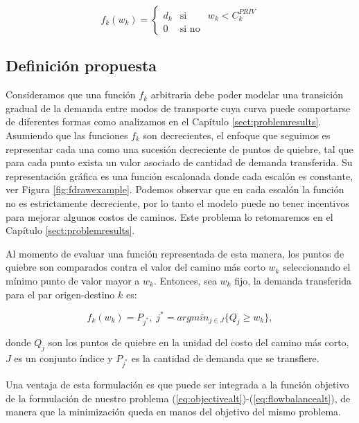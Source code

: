 \begin{equation}
  \label{eq:allornothing}
  f_k(w_k) = \left\{ \begin{array}{lcr}
    d_k & \mbox{si}   & w_k < C^{PRIV}_k \\
          0 & \mbox{si no} &
  \end{array}
  \right.
\end{equation}

\subsection{Definición propuesta}

Consideramos que una función $f_k$ arbitraria debe poder modelar una transición gradual de la demanda entre modos de transporte cuya curva puede comportarse de diferentes formas como analizamos en el Capítulo \ref{sect:problemresults}. Asumiendo que las funciones $f_k$ son decrecientes, el enfoque que seguimos es representar cada una como una sucesión decreciente de puntos de quiebre, tal que para cada punto exista un valor asociado de cantidad de demanda transferida. Su representación gráfica es una función escalonada donde cada escalón es constante, ver Figura \ref{fig:fdrawexample}. Podemos observar que en cada escalón la función no es estrictamente decreciente, por lo tanto el modelo puede no tener incentivos para mejorar algunos costos de caminos. Este problema lo retomaremos en el Capítulo \ref{sect:problemresults}.

Al momento de evaluar una función representada de esta manera, los puntos de quiebre son comparados contra el valor del camino más corto $w_k$ seleccionando el mínimo punto de valor mayor a $w_k$. Entonces, sea $w_k$ fijo, la demanda transferida para el par origen-destino $k$ es:

\begin{equation}
  \label{eq:deffks}
  f_k(w_k) = P_{j^*},\; j^* = argmin_{j \in J} \{Q_j \geq w_k\},
\end{equation}

donde $Q_j$ son los puntos de quiebre en la unidad del costo del camino más corto, $J$ es un conjunto índice y $P_{j^*}$ es la cantidad de demanda que se transfiere.

Una ventaja de esta formulación es que puede ser integrada a la función objetivo de la formulación de nuestro problema (\ref{eq:objectivealt})-(\ref{eq:flowbalancealt}), de manera que la minimización queda en manos del objetivo del mismo problema.

